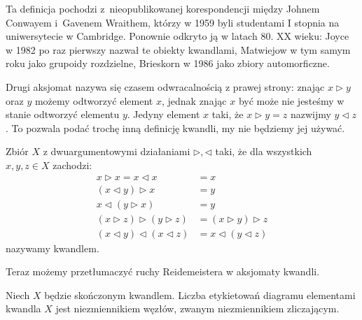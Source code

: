 Ta definicja pochodzi z~nieopublikowanej korespondencji między Johnem Conwayem i~Gavenem Wraithem, którzy w 1959 byli studentami I stopnia na uniwersytecie w Cambridge.
Ponownie odkryto ją w latach 80. XX wieku: Joyce w 1982 po raz pierwszy nazwał te obiekty kwandlami, Matwiejow w tym samym roku jako grupoidy rozdzielne, Brieskorn w 1986 jako zbiory automorficzne.
%
%

Drugi aksjomat nazywa się czasem odwracalnością z prawej strony: znając $x \triangleright y$ oraz $y$ możemy odtworzyć element $x$, jednak znając $x$ być może nie jesteśmy w stanie odtworzyć elementu $y$.
Jedyny element $x$ taki, że $x \triangleright y = z$ nazwijmy $y \triangleleft z$.
To pozwala podać trochę inną definicję kwandli, my nie będziemy jej używać.

\begin{definition}
    Zbiór $X$ z dwuargumentowymi działaniami $\triangleright, \triangleleft$ taki, że dla wszystkich $x, y, z \in X$ zachodzi:
    \begin{align*}
    x \triangleright x = x \triangleleft x & = x \\
    (x \triangleleft y) \triangleright x & = y \\
    x \triangleleft (y \triangleright x) & = y \\
     (x \triangleright z) \triangleright (y \triangleright z) & = (x \triangleright y) \triangleright z \\
    (x \triangleleft y) \triangleleft (x \triangleleft z) & = x \triangleleft (y \triangleleft z)
    \end{align*}
    nazywamy kwandlem.
\end{definition}

Teraz możemy przetłumaczyć ruchy Reidemeistera w aksjomaty kwandli.

\begin{proposition}
%
    Niech $X$ będzie skończonym kwandlem.
    Liczba etykietowań diagramu elementami kwandla $X$ jest niezmiennikiem węzłów, zwanym niezmiennikiem zliczającym.
\end{proposition}

